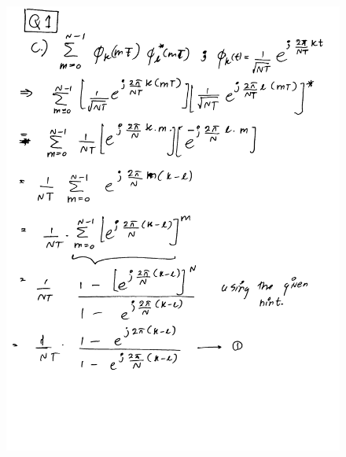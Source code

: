 \documentclass[a4paper,11pt]{article}%
\begin{document}
\begin{figure}[!h]
	\includegraphics[scale=0.22]{figures/img3}
\end{figure}
\end{document}
